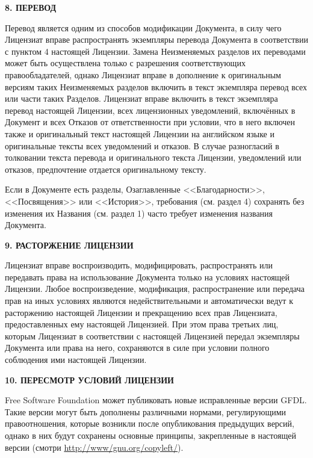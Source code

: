 \begin{center}
{\Large\bf 8. ПЕРЕВОД\par}
\end{center}


Перевод является одним из способов модификации Документа, в силу чего
Лицензиат вправе распространять экземпляры перевода Документа в
соответствии с пунктом 4 настоящей Лицензии. Замена Неизменяемых
разделов их переводами может быть осуществлена только с разрешения
соответствующих правообладателей, однако Лицензиат вправе в дополнение
к оригинальным версиям таких Неизменяемых разделов включить в текст
экземпляра перевод всех или части таких Разделов. Лицензиат вправе
включить в текст экземпляра перевод настоящей Лицензии, всех
лицензионных уведомлений, включённых в Документ и всех Отказов от
ответственности при условии, что в него включен также и оригинальный
текст настоящей Лицензии на английском языке и оригинальные тексты всех
уведомлений и отказов. В случае разногласий в толковании текста перевода
и оригинального текста Лицензии, уведомлений или отказов, предпочтение
отдается оригинальному тексту.

Если в Документе есть разделы, Озаглавленные <<Благодарности>>,
<<Посвящения>> или <<История>>, требования (см. раздел 4) сохранять без
изменения их Названия (см. раздел 1) часто требует изменения названия
Документа.


\begin{center}
{\Large\bf 9. РАСТОРЖЕНИЕ ЛИЦЕНЗИИ\par}
\end{center}


Лицензиат вправе воспроизводить, модифицировать, распространять или
передавать права на использование Документа только на условиях настоящей
Лицензии. Любое воспроизведение, модификация, распространение или
передача прав на иных условиях являются недействительными и
автоматически ведут к расторжению настоящей Лицензии и прекращению всех
прав Лицензиата, предоставленных ему настоящей Лицензией. При этом права
третьих лиц, которым Лицензиат в соответствии с настоящей Лицензией
передал экземпляры Документа или права на него, сохраняются в силе при
условии полного соблюдения ими настоящей Лицензии.


\begin{center}
{\Large\bf 10. ПЕРЕСМОТР УСЛОВИЙ ЛИЦЕНЗИИ\par}
\end{center}


Free Software Foundation может публиковать новые исправленные версии
GFDL. Такие версии могут быть дополнены различными нормами,
регулирующими правоотношения, которые возникли после опубликования
предыдущих версий, однако в них будут сохранены основные принципы,
закрепленные в настоящей версии (смотри \url{http://www/gnu.org/copyleft/}).

